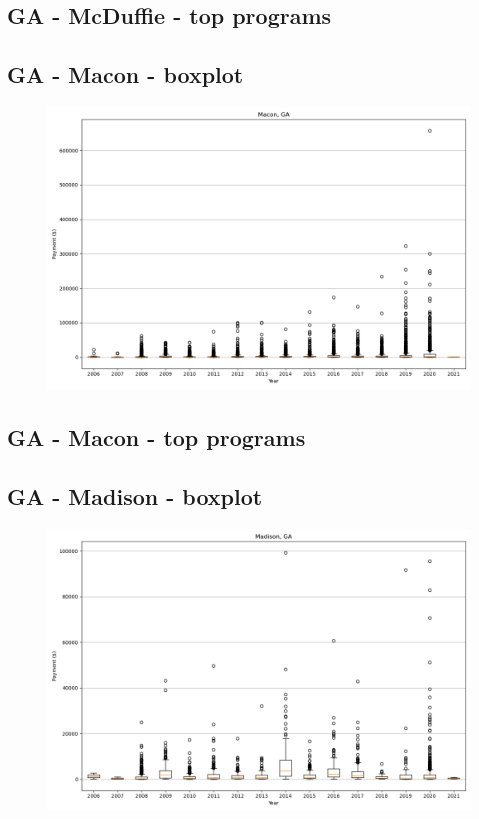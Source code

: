 \subsection*{GA - McDuffie - top programs}

\newpage
\subsection*{GA - Macon - boxplot}
\begin{figure}[h]
\centering
\includegraphics[width=7in]{../output/boxplots/counties/Macon-GA_boxplot.png}
\end{figure}


\subsection*{GA - Macon - top programs}

\newpage
\subsection*{GA - Madison - boxplot}
\begin{figure}[h]
\centering
\includegraphics[width=7in]{../output/boxplots/counties/Madison-GA_boxplot.png}
\end{figure}


